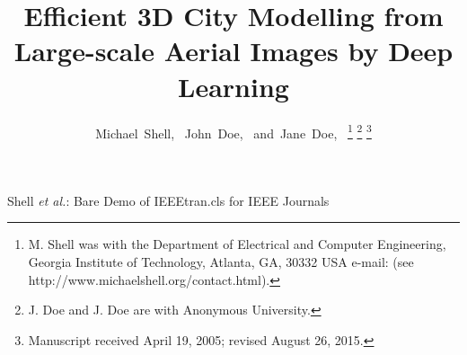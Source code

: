 \documentclass[journal]{IEEEtran}
\begin{document}
\title{Efficient 3D City Modelling from Large-scale Aerial Images by Deep Learning}
%
%
%

\author{Michael~Shell,~
        John~Doe,~
        and~Jane~Doe,~%
\thanks{M. Shell was with the Department
of Electrical and Computer Engineering, Georgia Institute of Technology, Atlanta,
GA, 30332 USA e-mail: (see http://www.michaelshell.org/contact.html).}%
\thanks{J. Doe and J. Doe are with Anonymous University.}%
\thanks{Manuscript received April 19, 2005; revised August 26, 2015.}}

%
{Shell \MakeLowercase{\textit{et al.}}: Bare Demo of IEEEtran.cls for IEEE Journals}
\maketitle










\end{document}
